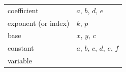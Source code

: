 {{\begin{center}
\begin{tabular}[t]{|l|l|}
        coefficient &
        $a$, $b$, $d$, $e$%
     \tabularnewline\cline{1-1}\cline{2-2}
        exponent (or index) &
        $k$, $p$%
     \tabularnewline\cline{1-1}\cline{2-2}
        base &
        $x$, $y$, $c$%
     \tabularnewline\cline{1-1}\cline{2-2}
        constant &
        $a$, $b$, $c$, $d$, $e$, $f$%
     \tabularnewline\cline{1-1}\cline{2-2}
        variable &

\end{tabular}
\end{center}}}
